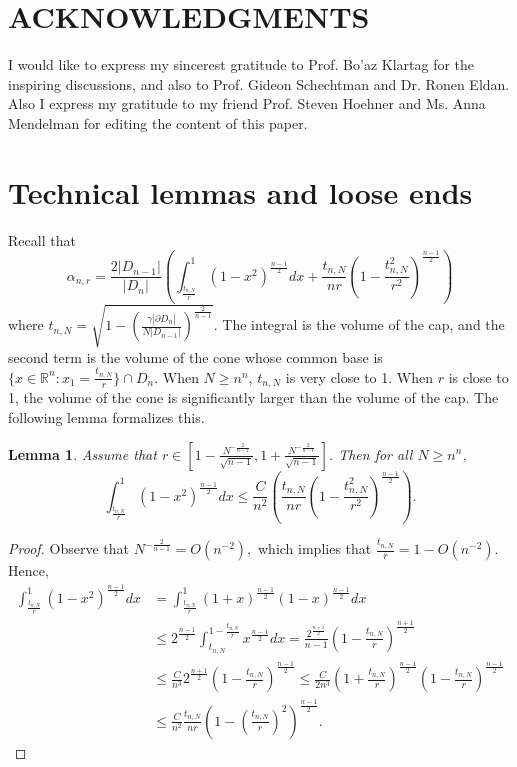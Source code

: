 \documentclass[10pt, twoside, leqno]{article}
\newtheorem{lemma}[thm]{Lemma}
\theoremstyle{definition}
\numberwithin{equation}{section}
\newcommand{\be}{\begin{equation}}
\newcommand{\ee}{\end{equation}}
\newcommand{\R}{\mathbb{R}}
\newcommand{\NN}{N^{-\frac 2{n-1} }}
\begin{document}
\section*{ACKNOWLEDGMENTS}
I would like to express my sincerest gratitude to Prof. Bo'az Klartag for the inspiring discussions, and also to Prof. Gideon Schechtman and Dr. Ronen Eldan. 
Also I express my gratitude to my friend Prof. Steven Hoehner and Ms. Anna Mendelman for editing the content of this paper.

\section{Technical lemmas and loose ends}{\label{Techandloose}}
Recall that
\[ 
\alpha_{n,r} = \frac{2|D_{n-1}|}{|D_n|}\left(\int_{\frac{t_{n,N}}{r}}^{1}\left(1-x^2\right)^{\frac{n-1}{2}}dx  +\frac {t_{n,N}}{nr} \left(1-\frac{t_{n,N}^2}{r^2}\right)^{\frac{n-1}{2}}\right) 
\]
where $t_{n,N} = \sqrt{1 - \left(\frac{\gamma |\partial D_n|}{N|D_{n-1}|}\right)^{\frac 2{n-1}}}$.  The integral is the volume of the cap, and the second term is the volume of the cone whose common base is $ \{x\in\R^n: x_1 = \frac {t_{n,N}}r\} \cap D_n.$ 
When $N\geq n^n$, $ t_{n,N} $ is very close to 1. When $ r $ is close to 1, the volume of the cone is significantly larger than the volume of the cap. The following lemma formalizes this.
\begin{lemma}{\label{sub_main_lemma}}
	Assume that $ r \in [1-\frac{\NN}{\sqrt{n-1}}, 1+\frac{\NN}{\sqrt{n-1}}]$. Then for all $N\geq n^n$,
	\be
	\int_{\frac{t_{n,N}}{r}}^{1}\left(1-x^2\right)^{\frac{n-1}{2}}dx \leq \frac{C}{n^2}\left(\frac {t_{n,N}}{nr} \left(1-\frac{t_{n,N}^2}{r^2}\right)^{\frac{n-1}{2}}\right).
	\ee
\end{lemma}
\begin{proof} Observe that  $ \NN = O(n^{-2}),$ which implies that  $ \frac {t_{n,N}}r = 1-O\left(n^{-2}\right)$. Hence, 
	\begin{equation}
\begin{aligned}\int_{\frac{t_{n,N}}{r}}^{1}\left(1-x^{2}\right)^{\frac{n-1}{2}}dx & =\int_{\frac{t_{n,N}}{r}}^{1}(1+x)^{\frac{n-1}{2}}\left(1-x\right)^{\frac{n-1}{2}}dx\\
& \leq2^{\frac{n-1}{2}}\int_{t_{n,N}}^{1-\frac{t_{n,N}}{r}}x^{\frac{n-1}{2}}dx=\frac{2^{\frac{n+1}{2}}}{n-1}\left(1-\frac{t_{n,N}}{r}\right)^{\frac{n+1}{2}}\\
& \leq\frac{C}{n^{3}}2^{\frac{n+1}{2}}\left(1-\frac{t_{n,N}}{r}\right)^{\frac{n-1}{2}}\leq\frac{C}{2n^{3}}\left(1+\frac{t_{n,N}}{r}\right)^{\frac{n-1}{2}}\left(1-\frac{t_{n,N}}{r}\right)^{\frac{n-1}{2}}\\
& \leq\frac{C}{n^{2}}\frac{t_{n,N}}{nr}\left(1-\left(\frac{t_{n,N}}{r}\right)^{2}\right)^{\frac{n-1}{2}}.
\end{aligned}
	\end{equation}
\end{proof}	
\end{document}
